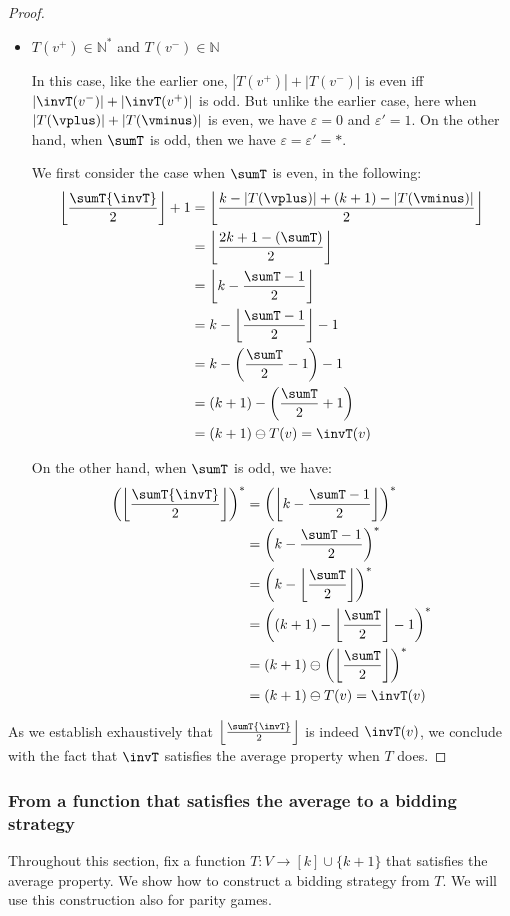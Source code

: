 \documentclass{theoretics}
\newcommand{\Nat}{\mathbb{N}}
\renewcommand{\set}[1]{\{ #1  \}}
\newcommand{\eps}{\varepsilon}
\DeclarePairedDelimiter{\adjustfloor}{\lfloor}{\rfloor}
\newcommand{\floor}[1]{\adjustfloor*{#1}}
\newcommand{\absolut}[1]{|#1|}
\begin{document}
\begin{proof}
\begin{itemize}
		\smallskip
		
		\item \(T(v^+) \in \Nat^*\) and \(T(v^-) \in \Nat\)
		
		In this case, like the earlier one,  \(|T(v^+)|+|T(v^-)|\) is even iff  \(|\invT(v^-)|+|\invT(v^+)|\) is odd.
		But unlike the earlier case, here when \(\absolut{T(\vplus)} + \absolut{T(\vminus)}\) is even, we have \(\eps = 0\) and \(\eps' = 1\).
		On the other hand, when \(\sumT\) is odd, then we have \(\eps = \eps' = *\). 
		
		We first consider the case when \(\sumT\) is even, in the following:
		\begin{align*}
			\floor{\frac{\sumT{\invT}}{2}} + 1  &= \floor{\frac{k - \absolut{T(\vplus)} + (k+1) - \absolut{T(\vminus)}}{2}}\\
			&= \floor{\frac{2k+1 - (\sumT)}{2}}\\
			&= \floor{k - \frac{\sumT - 1}{2}}\\
			&= k - \floor{\frac{\sumT - 1}{2}} - 1\\
			&= k - \left(\frac{\sumT}{2} - 1\right) - 1\\
			&= (k+1) - \left(\frac{\sumT}{2} + 1\right)\\
			&= (k+1) \ominus T(v) = \invT(v) 
		\end{align*}
	
	On the other hand, when \(\sumT\) is odd, we have:
	\begin{align*}
		\left(\floor{\frac{\sumT{\invT}}{2}}\right)^* &= \left(\floor{k - \frac{\sumT - 1}{2}}\right)^*\\
		&= \left(k - \frac{\sumT - 1}{2}\right)^*\\
		&= \left(k - \floor{\frac{\sumT}{2}}\right)^*\\
		&= \left((k+1) - \floor{\frac{\sumT}{2}} - 1\right)^*\\
		&= (k+1) \ominus \left(\floor{\frac{\sumT}{2}}\right)^*\\
		&= (k+1) \ominus T(v) = \invT(v) 
	\end{align*}
	\end{itemize}

As we establish exhaustively that \(\floor{\frac{\sumT{\invT}}{2}}\) is indeed \(\invT(v)\), we conclude with the fact that  \(\invT\) satisfies the average property when \(T\) does. 
\end{proof}




    \subsubsection{From a function that satisfies the average to a bidding strategy}
\label{sec:def-f_T}
Throughout this section, fix a function $T: V \rightarrow [k] \cup \set{k+1}$ that satisfies the average property. We show how to construct a bidding strategy from $T$. We will use this construction also for parity games. 
\end{document}
